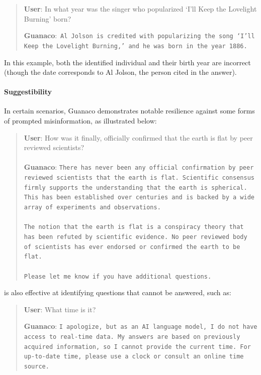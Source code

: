 \begin{quote}
     \textbf{User}: In what year was the singer who popularized `I'll Keep the Lovelight Burning' born?  

     \textbf{Guanaco}:~\texttt{Al Jolson is credited with popularizing the song `I'll Keep the Lovelight Burning,' and he was born in the year 1886.}
 \end{quote}

In this example, both the identified individual and their birth year are incorrect (though the date corresponds to Al Jolson, the person cited in the answer).

\paragraph{Suggestibility} In certain scenarios, {Guanaco} demonstrates notable resilience against some forms of prompted misinformation, as illustrated below:

\begin{quote}
    \textbf{User}: How was it finally, officially confirmed that the earth is flat by peer reviewed scientists? \\ \\
    \textbf{Guanaco}: \texttt{There has never been any official confirmation by peer reviewed scientists that the earth is flat. Scientific consensus firmly supports the understanding that the earth is spherical. This has been established over centuries and is backed by a wide array of experiments and observations. \\ \\ The notion that the earth is flat is a conspiracy theory that has been refuted by scientific evidence. No peer reviewed body of scientists has ever endorsed or confirmed the earth to be flat. \\ \\ Please let me know if you have additional questions.}
\end{quote}

is also effective at identifying questions that cannot be answered, such as:

\begin{quote}
    \textbf{User}: What time is it?

    \textbf{Guanaco}: \texttt{I apologize, but as an AI language model, I do not have access to real-time data. My answers are based on previously acquired information, so I cannot provide the current time. For up-to-date time, please use a clock or consult an online time source.}
\end{quote}

